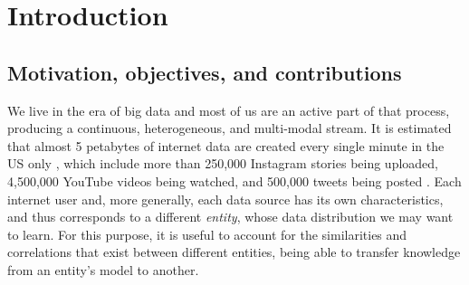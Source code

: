 
\chapter{Introduction}


\label{chp:intro}


\section{Motivation, objectives, and contributions}

We live in the era of big data and most of us are an active part of that process, producing a continuous, heterogeneous, and multi-modal stream. It is estimated that almost 5 petabytes of internet data are created every single minute in the US only \cite{Forbes}, which include more than 250,000 Instagram stories being uploaded, 4,500,000 YouTube videos being watched, and 500,000 tweets being posted \cite{DOMO}. Each internet user and, more generally, each data source has its own characteristics, and thus corresponds to a different \emph{entity}, whose data distribution we may want to learn. For this purpose, it is useful to account for the similarities and correlations that exist between different entities, being able to transfer knowledge from an entity's model to another.

